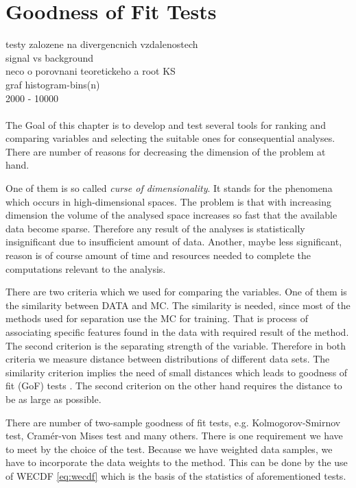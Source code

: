 \chapter{Goodness of Fit Tests}
\label{ch:GoF}


testy zalozene na divergencnich vzdalenostech \\
signal vs background \\
neco o porovnani teoretickeho a root KS \\
graf histogram-bins(n)\\ 2000 - 10000
\\
\\


\noindent The Goal of this chapter is to develop and test several tools for ranking and comparing variables and selecting the suitable ones for consequential analyses. There are number of reasons for decreasing the dimension of the problem at hand. 

One of them is so called {\em curse of dimensionality}. It stands for the phenomena which occurs in high-dimensional spaces. The problem is that with increasing dimension the volume of the analysed space increases so fast that the available data become sparse. Therefore any result of the analyses is statistically insignificant due to insufficient amount of data. Another, maybe less significant, reason is of course amount of time and resources needed to complete the computations relevant to the analysis. 

There are two criteria which we used for comparing the variables. One of them is the similarity between DATA and MC. The similarity is needed, since most of the methods used for separation use the MC for training. That is process of associating specific features found in the data with required result of the method. The second criterion is the separating strength of the variable. Therefore in both criteria we measure distance between distributions of different data sets. The similarity criterion implies the need of small distances which leads to goodness of fit (GoF)  tests . The second criterion on the other hand requires the distance to be as large as possible. 

There are number of two-sample goodness of fit  tests, e.g. Kolmogorov-Smirnov test, Cram\'{e}r-von Mises test and many others. There is one requirement we have to meet by the choice of the test. Because we have weighted data samples, we have to incorporate the data weights to the method. This can be done by the use of WECDF  \eqref{eq:wecdf} which is the basis of the statistics of aforementioned tests. 

